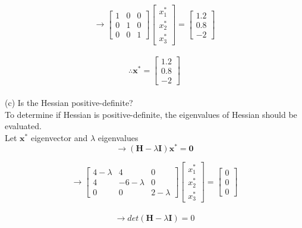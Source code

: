 \documentclass{article} %
\begin{document}
{    \[ \rightarrow \begin{bmatrix}
        1 & 0 & 0 \\
        0 & 1 & 0 \\
        0 & 0 & 1
    \end{bmatrix} \begin{bmatrix}
        x^*_1 \\ x^*_2 \\ x^*_3
    \end{bmatrix} = \begin{bmatrix}
        1.2 \\ 0.8 \\ -2
    \end{bmatrix} \] \\

    \[ \therefore \mathbf{x^*} = \begin{bmatrix}
        1.2 \\ 0.8 \\ -2
    \end{bmatrix} \] \\

    (c) Is the Hessian positive-definite? \\

    To determine if Hessian is positive-definite, the eigenvalues of Hessian should be evaluated. \\
    Let $\mathbf{x^*}$ eigenvector and $\lambda$ eigenvalues \\

    \[ \rightarrow (\mathbf{H} - \lambda \mathbf{I}) \mathbf{x^*} = \mathbf{0} \]

    \[ \rightarrow \begin{bmatrix}
        4 - \lambda & 4 & 0 \\
        4 & -6 - \lambda & 0 \\
        0 & 0 & 2 - \lambda
    \end{bmatrix} \begin{bmatrix}
        x^*_1 \\ x^*_2 \\ x^*_3
    \end{bmatrix} = \begin{bmatrix}
        0 \\ 0 \\ 0
    \end{bmatrix} \] \\

    \[ \rightarrow det(\mathbf{H} - \lambda \mathbf{I}) = 0 \] \\

}
\end{document}
